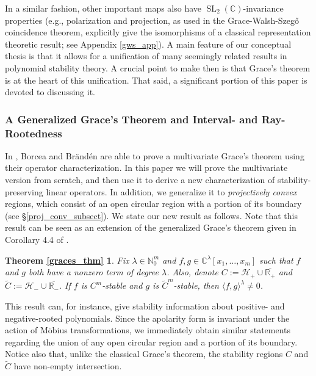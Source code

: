 \documentclass{article}
\theoremstyle{definition}
\theoremstyle{plain}
\newcommand{\C}{\mathbb{C}}
\newcommand{\R}{\mathbb{R}}
\newcommand{\N}{\mathbb{N}}
\newcommand{\UHP}{\mathcal{H}_+}
\newcommand{\LHP}{\mathcal{H}_-}
\DeclareMathOperator{\SL}{SL}
\begin{document}
In a similar fashion, other important maps also have $\SL_2(\C)$-invariance properties (e.g., polarization and projection, as used in the Grace-Walsh-Szeg{\H{o}} coincidence theorem, explicitly give the isomorphisms of a classical representation theoretic result; see Appendix \ref{gws_app}). A main feature of our conceptual thesis is that it allows for a unification of many seemingly related results in polynomial stability theory. A crucial point to make then is that Grace's theorem is at the heart of this unification. That said, a significant portion of this paper is devoted to discussing it.

\subsubsection*{A Generalized Grace's Theorem and Interval- and Ray-Rootedness}

In \cite{bb2}, Borcea and Br{\"a}nd{\'e}n are able to prove a multivariate Grace's theorem using their operator characterization. In this paper we will prove the multivariate version from scratch, and then use it to derive a new characterization of stability-preserving linear operators. In addition, we generalize it to \emph{projectively convex} regions, which consist of an open circular region with a portion of its boundary (see \S\ref{proj_conv_subsect}). We state our new result as follows. Note that this result can be seen as an extension of the generalized Grace's theorem given in Corollary 4.4 of \cite{zaheer1976polar}.

\newtheorem*{graces_thm}{Theorem \ref{graces_thm}}
\begin{graces_thm}
    Fix $\lambda \in \N_0^m$ and $f,g \in \C^\lambda[x_1,\ldots,x_m]$ such that $f$ and $g$ both have a nonzero term of degree $\lambda$. Also, denote $C := \UHP \cup \overline{\R_+}$ and $\widetilde{C} := \LHP \cup \overline{\R_-}$. If $f$ is $C^m$-stable and $g$ is $\widetilde{C}^m$-stable, then $\langle f,g \rangle^\lambda \neq 0$.
\end{graces_thm}

This result can, for instance, give stability information about positive- and negative-rooted polynomials. Since the apolarity form is invariant under the action of M{\"o}bius transformations, we immediately obtain similar statements regarding the union of any open circular region and a portion of its boundary. Notice also that, unlike the classical Grace's theorem, the stability regions $C$ and $\widetilde{C}$ have non-empty intersection.
\end{document}
